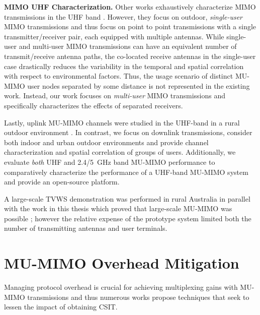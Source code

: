 \textbf{MIMO UHF Characterization.}
	Other works exhaustively characterize MIMO transmissions in the UHF band \cite{boyer2007mimo, eriksson2008urban, hammons2008cooperative, jung2011multipath, parviainen2009experimental}.
	However, they focus on outdoor, \emph{single-user} MIMO transmissions and thus focus on point to point transmissions  with a single transmitter/receiver pair, each equipped with multiple antennas.
	While single-user and multi-user MIMO transmissions can have an equivalent number of transmit/receive antenna paths, the co-located receive antennas in the single-user case drastically reduces the variability in the temporal and spatial correlation with respect to environmental factors.
	Thus, the usage scenario of distinct \ac{MU-MIMO} user nodes separated by some distance is not represented in the existing work.
	Instead, our work focuses on \textit{multi-user} MIMO transmissions and specifically characterizes the effects of separated receivers.

	Lastly, uplink \ac{MU-MIMO} channels were studied in the UHF-band in a rural outdoor environment
\cite{collings2012ngara, suzuki2012large}. 
	In contrast, we focus on downlink transmissions, consider both indoor and urban outdoor environments and provide channel characterization and spatial correlation of groups of users. 
	Additionally, we evaluate \textit{both} UHF and 2.4/5~GHz band \ac{MU-MIMO} performance to comparatively characterize the performance of a UHF-band \ac{MU-MIMO} system and provide an open-source platform.
	
	A large-scale \ac{TVWS} demonstration was performed in rural Australia in parallel with the work in this thesis which proved that large-scale \ac{MU-MIMO} was possible \cite{suzuki2012highly, suzuki2012large}; however the relative expense of the prototype system limited both the number of transmitting antennas and user terminals.


\section{MU-MIMO Overhead Mitigation} 
\label{sec_related_overhead}

Managing protocol overhead is crucial for achieving multiplexing gains with \ac{MU-MIMO} transmissions and thus numerous works propose techniques that seek to lessen the impact of obtaining \ac{CSIT}.


